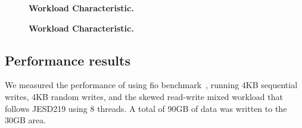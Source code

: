 \begin{figure}[t]
    \centering{}
    \caption{\textbf{Workload Characteristic.}}

    \centering{} 
    \caption{\textbf{Workload Characteristic.}}
\end{figure} 

\fi

\subsection{Performance results}
We measured the performance of \ours{} using fio benchmark~\cite{fio-bench},
running 4KB sequential writes, 4KB random writes, and the skewed read-write
mixed workload that follows JESD219 using 8 threads.  A total of 90GB of data
was written to the 30GB area.


